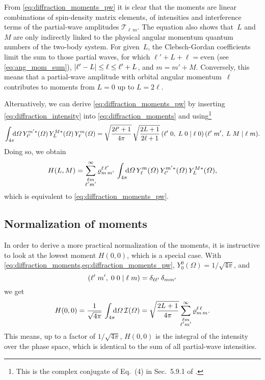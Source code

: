 From \cref{eq:diffraction_moments_pw} it is clear that the moments are
linear combinations of spin-density matrix elements, \ie of
intensities and interference terms of the partial-wave amplitudes
$\mathcal{T}_{\ell\, m}$.  The equation also shows that~$L$ and~$M$
are only indirectly linked to the physical angular momentum quantum
numbers of the two-body system.  For given~$L$, the Clebsch-Gordan
coefficients limit the sum to those partial waves, for which $\ell' +
L + \ell = \text{even}$ (see \cref{eq:ang_mom_sum}), $\vert{\ell' - L}\vert
\leq \ell \leq \ell' + L$, and $m = m' + M$.  Conversely, this means
that a partial-wave amplitude with orbital angular momentum~$\ell$
contributes to moments from $L = 0$ up to $L = 2 \ell$.

Alternatively, we can derive \cref{eq:diffraction_moments_pw} by
inserting \cref{eq:diffraction_intensity} into
\cref{eq:diffraction_moments} and using\footnote{This is the complex
conjugate of Eq.~(4) in Sec.~5.9.1 of .}
\begin{equation}
  \label{eq:spherical_harm_clebsch}
  \int_{4 \pi}\!\!\! \dif{\Omega}\,
  Y_{\ell'}^{m' *}(\Omega)\, Y_L^{M *}(\Omega)\, Y_{\ell}^m(\Omega)
  = \sqrt{\frac{2 \ell' + 1}{4 \pi}}\, \sqrt{\frac{2 L + 1}{2 \ell + 1}}\, \clebsch{\ell'}{0}{L}{0}{\ell}{0}\, \clebsch{\ell'}{m'}{L}{M}{\ell}{m}.
\end{equation}
Doing so, we obtain
\begin{equation}
  H(L, M)
  = \sum_{\substack{\ell m \\ \ell' m'}}^\infty
  \varrho^{\ell\, \ell'}_{m\, m'}\,
  \int_{4 \pi}\!\!\! \dif{\Omega}\,
  Y_\ell^m(\Omega)\,
  Y_{\ell'}^{m' *}(\Omega)\,
  Y_L^{M *}(\Omega),
\end{equation}
which is equivalent to \cref{eq:diffraction_moments_pw}.


\subsection{Normalization of moments}%
\label{sec:diffraction:moments_norm}

In order to derive a more practical normalization of the moments, it
is instructive to look at the lowest moment $H(0, 0)$, which is a
special case.  With
\cref{eq:diffraction_moments,eq:diffraction_moments_pw},
$Y_0^0(\Omega) = 1 / \sqrt{4 \pi}$, and
\begin{equation}
  ({\ell'}\;{m'},\;{0}\;{0}\; |\; {\ell}\;{m})
  = \delta_{\ell \ell'}\, \delta_{m m'}
\end{equation}
we get
\begin{equation}
  H(0, 0)
  = \frac{1}{\sqrt{4 \pi}}\, \int_{4 \pi}\!\!\! \dif{\Omega}\, \mathcal{I}(\Omega)
  = \sqrt{\frac{2 L + 1}{4 \pi}} \sum_{\substack{\ell m \\ \ell' m'}}^\infty \varrho^{\ell\, \ell}_{m\, m}.
\end{equation}
This means, up to a factor of $1 / \sqrt{4 \pi}$, $H(0, 0)$ is the
integral of the intensity over the phase space, which is identical to
the sum of all partial-wave intensities.


